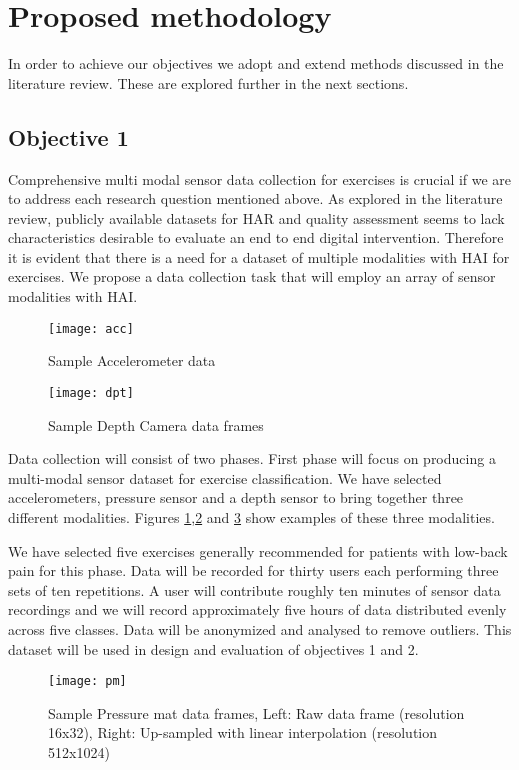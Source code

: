 \section{Proposed methodology}
\label{sec:methods}
In order to achieve our objectives we adopt and extend methods discussed in the literature review. These are explored further in the next sections.
\subsection{Objective 1}
Comprehensive multi modal sensor data collection for exercises is crucial if we are to address each research question mentioned above. As explored in the literature review, publicly available datasets for HAR and quality assessment seems to lack characteristics desirable to evaluate an end to end digital intervention. Therefore it is evident that there is a need for a dataset of multiple modalities with HAI for exercises. 
We propose a data collection task that will employ an array of sensor modalities with HAI.

\begin{figure}[ht]
\centering
\texttt{[image: acc]}
\caption{Sample Accelerometer data}
\label {fig:acce}
\end{figure}

\begin{figure}[ht]
\centering
\texttt{[image: dpt]}
\caption{Sample Depth Camera data frames}
\label {fig:rgbd}
\end{figure}

Data collection will consist of two phases. First phase will focus on producing a multi-modal sensor dataset for exercise classification. We have selected accelerometers, pressure sensor and a depth sensor to bring together three different modalities. Figures \ref{fig:acce},\ref{fig:rgbd} and \ref{fig:pressure} show examples of these three modalities.

We have selected five exercises generally recommended for patients with low-back pain for this phase. Data will be recorded for thirty users each performing three sets of ten repetitions. A user will contribute roughly ten minutes of sensor data recordings and we will record approximately five hours of data distributed evenly across five classes. Data will be anonymized and analysed to remove outliers. This dataset will be used in design and evaluation of objectives 1 and 2.

\begin{figure}[ht]
\centering
\texttt{[image: pm]}
\caption{Sample Pressure mat data frames, Left: Raw data frame (resolution 16x32), Right: Up-sampled with linear interpolation (resolution 512x1024) }
\label{fig:pressure}
\end{figure}

